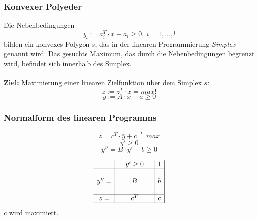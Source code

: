 \subsubsection{Konvexer Polyeder}
Die Nebenbedingungen
\[y_i := a_i^T \cdot x + a_i \geq 0,~i = 1,...,l\]
bilden ein konvexes Polygon \(s\), das in der linearen Programmierung \textit{Simplex} genannt wird. Das gesuchte Maximum, das durch die Nebenbedingungen begrenzt wird, befindet sich innerhalb des Simplex.
\\\\
\textbf{Ziel:} Maximierung einer linearen Zielfunktion über dem Simplex \(s\):
\[z := z^T \cdot x = max!\]
\[y := A\cdot x + a \geq 0\]

\subsubsection{Normalform des linearen Programms}
\[z = c^T\cdot \bar{y} + c \stackrel{!}{=} max\]
\[y' \geq 0\]
\[y'' = B \cdot y' + b \geq 0\]

\[\begin{array}{c|ccc|c|}
	& & y' \geq 0 & & 1 \\
	\hline
	& & & & \\
	y''= & & B & & b \\
	& & & & \\
	\hline
	z= & & c^T & & c \\
	\hline
\end{array}\]
\(c\) wird maximiert.


